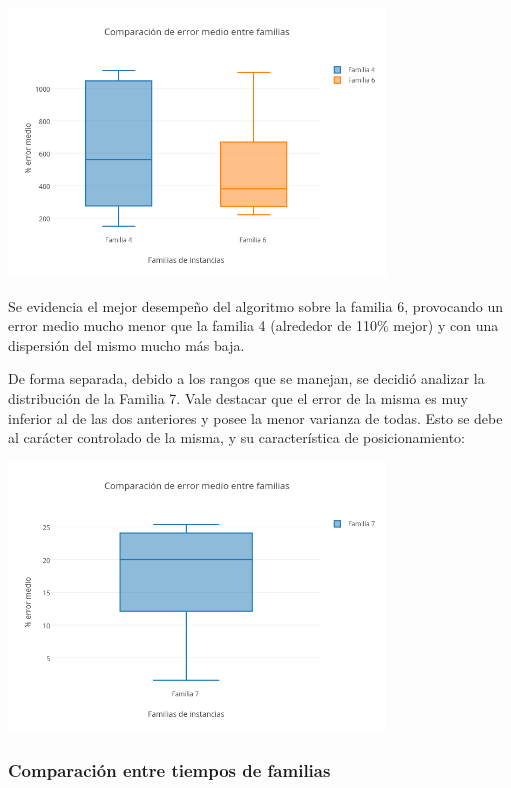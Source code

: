 \vspace*{0.3cm} \vspace*{0.3cm}
  \begin{center}
 \includegraphics[width=0.75\textwidth]{./EJ2/box.png}
\end{center}

Se evidencia el mejor desempeño del algoritmo sobre la familia 6, provocando un error medio mucho menor que la familia 4 (alrededor de 110\% mejor) y con una dispersión del mismo mucho más baja. 

De forma separada, debido a los rangos que se manejan, se decidió analizar la distribución de la Familia 7. Vale destacar que el error de la misma es muy inferior al de las dos anteriores y posee la menor varianza de todas. Esto se debe al carácter controlado de la misma, y su característica de posicionamiento: 
\vspace*{0.3cm} \vspace*{0.3cm}
  \begin{center}
 \includegraphics[width=0.75\textwidth]{./EJ2/box1.png}
\end{center}

\subsubsection*{Comparación entre tiempos de familias}

